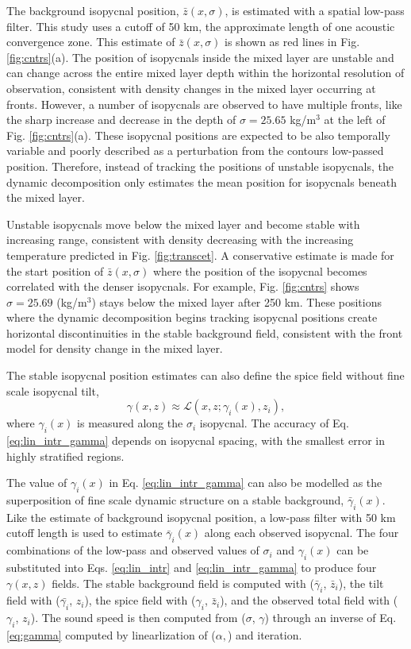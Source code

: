 \documentclass[preprint,NumberedRefs]{JASA}
\begin{document}
The background isopycnal position, $\bar{z}(x, \sigma)$, is estimated with a spatial low-pass filter. This study uses a cutoff of 50 km, the approximate length of one acoustic convergence zone\cite{jensen2011computational}. This estimate of $\bar{z}(x, \sigma)$ is shown as red lines in Fig. \ref{fig:cntrs}(a). The position of isopycnals inside the mixed layer are unstable and can change across the entire mixed layer depth within the horizontal resolution of observation, consistent with density changes in the mixed layer occurring at fronts. However, a number of isopycnals are observed to have multiple fronts, like the sharp increase and decrease in the depth of $\sigma=25.65$ kg/m$^3$ at the left of Fig. \ref{fig:cntrs}(a). These isopycnal positions are expected to be also temporally variable and poorly described as a perturbation from the contours low-passed position. Therefore, instead of tracking the positions of unstable isopycnals, the dynamic decomposition only estimates the mean position for isopycnals beneath the mixed layer.

Unstable isopycnals move below the mixed layer and become stable with increasing range, consistent with density decreasing with the increasing temperature predicted in Fig. \ref{fig:transcet}. A conservative estimate is made for the start position of $\bar{z}(x, \sigma)$ where the position of the isopycnal becomes correlated with the denser isopycnals. For example, Fig. \ref{fig:cntrs} shows $\sigma=25.69$ (kg/m$^3$) stays below the mixed layer after 250 km. These positions where the dynamic decomposition begins tracking isopycnal positions create horizontal discontinuities in the stable background field, consistent with the front model for density change in the mixed layer.

The stable isopycnal position estimates can also define the spice field without fine scale isopycnal tilt,
\begin{equation}
    \gamma(x, z)\approx\mathcal{L}(x, z; \gamma_i(x), z_i),
    \label{eq:lin_intr_gamma}
\end{equation}
where $\gamma_i(x)$ is measured along the $\sigma_i$ isopycnal. The accuracy of Eq. \eqref{eq:lin_intr_gamma} depends on isopycnal spacing, with the smallest error in highly stratified regions.

The value of $\gamma_i(x)$ in Eq. \eqref{eq:lin_intr_gamma} can also be modelled as the superposition of fine scale dynamic structure on a stable background, $\bar{\gamma}_i(x)$. Like the estimate of background isopycnal position, a low-pass filter with 50 km cutoff length is used to estimate $\bar{\gamma}_i(x)$ along each observed isopycnal. The four combinations of the low-pass and observed values of $\sigma_i$ and $\gamma_i(x)$ can be substituted into Eqs. \eqref{eq:lin_intr} and \eqref{eq:lin_intr_gamma} to produce four $\gamma(x,z)$ fields. The stable background field is computed with ($\bar{\gamma}_i$, $\bar{z}_i$), the tilt field with ($\bar{\gamma_i}$, $z_i$), the spice field with ($\gamma_i$, $\bar{z}_i$), and the observed total field with ($\gamma_i$, $z_i$). The sound speed is then computed from ($\sigma$, $\gamma$) through an inverse of Eq. \eqref{eq:gamma} computed by linearlization of ($\alpha, $\beta) and iteration.
\end{document}

